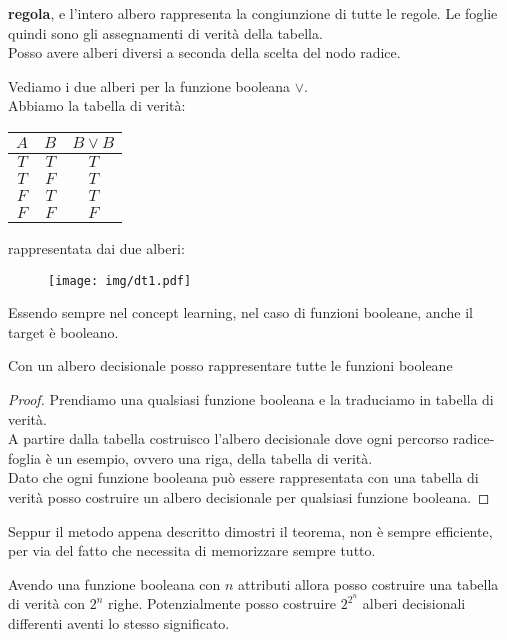 \textbf{regola}, e l'intero albero rappresenta la congiunzione di tutte le
regole. Le foglie quindi sono gli assegnamenti di verità della tabella.\\ 
Posso avere alberi diversi a seconda della scelta del nodo radice.\\
\begin{esempio}
  Vediamo i due alberi per la funzione booleana $\lor$.\\
  Abbiamo la tabella di verità:
  \begin{table}[H]
    \centering
    \begin{tabular}{c|c|c}
      $A$ & $B$ & $B\lor B$\\
      \hline
      $T$ & $T$ & $T$\\
      $T$ & $F$ & $T$\\
      $F$ & $T$ & $T$\\
      $F$ & $F$ & $F$
    \end{tabular}
  \end{table}
  rappresentata dai due alberi:
  \begin{figure}[H]
    \centering
    \texttt{[image: img/dt1.pdf]}
  \end{figure}
\end{esempio}
Essendo sempre nel concept learning, nel caso di funzioni booleane, anche il
target è booleano.
\begin{teorema}
  Con un albero decisionale posso rappresentare tutte le
  funzioni booleane
\end{teorema}
\begin{proof}
  Prendiamo una qualsiasi funzione booleana e la traduciamo in tabella di
  verità.\\
  A partire dalla tabella costruisco l'albero decisionale dove ogni percorso
  radice-foglia è un esempio, ovvero una riga, della tabella di verità.\\
  Dato che ogni funzione booleana può essere rappresentata con una tabella di
  verità posso costruire un albero decisionale per qualsiasi funzione booleana.
\end{proof}
Seppur il metodo appena descritto dimostri il teorema, non è sempre
efficiente, per via del fatto che necessita di memorizzare sempre tutto.
\begin{teorema}
  Avendo una funzione booleana con $n$ attributi allora posso costruire una
  tabella di verità con $2^n$ righe. Potenzialmente posso costruire 
  $2^{2^n}$ alberi decisionali differenti aventi lo stesso significato.
\end{teorema}
